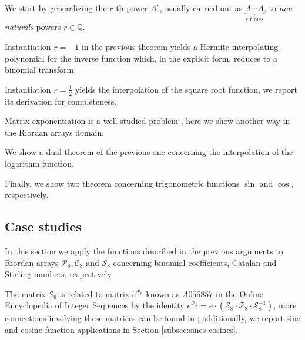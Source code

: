 We start by generalizing the $r$-th power $A^{r}$, usually carried out
as $\underbrace{A\cdots A}_{r\text{ times}}$, to \textit{non-naturals} powers
$r\in\mathbb{Q}$.



Instantiation $r=-1$ in the previous theorem yields a Hermite interpolating
polynomial for the inverse function which, in the explicit form, reduces to
a binomial transform.



Instantiation $r=\frac{1}{2}$ yields the interpolation of the square root function,
we report its derivation for completeness.



Matrix exponentiation is a well studied problem \cite{MOLERLOAN2003}, here
we show another way in the Riordan arrays domain. 



We show a dual theorem of the previous one concerning the interpolation of the
logarithm function.



Finally, we show two theorem concerning trigonometric functions $\sin$ and
$\cos$, respectively.





\subsection{Case studies}

In this section we apply the functions described in the previous arguments to
Riordan arrays $\mathcal{P}_{8}, \mathcal{C}_{8}$ and $\mathcal{S}_{8}$
concerning binomial coefficients, Catalan and Stirling numbers, respectively.









The matrix $\mathcal{S}_{8}$ is related to matrix $e^{\mathcal{P}_{8}}$ known as
$A056857$ in the Online Encyclopedia of Integer Sequences \cite{OEIS} by the
identity $ e^{\mathcal{P}_{8}}=e\cdot\left(\mathcal{S}_{8}\cdot
\mathcal{P}_{8}\cdot \mathcal{S}_{8}^{-1}\right)$, more connections
involving these matrices can be found in \cite{CHEON200149}; additionally, we report
sine and cosine function applications in Section \ref{subsec:sines-cosines}.

